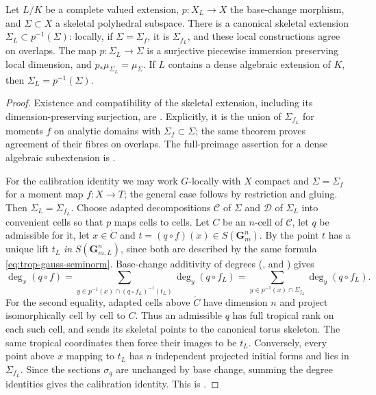 \begin{proposition}
\label{prop:trop-calibration-base-change}
Let $L/K$ be a complete valued extension, $p:X_L\to X$ the base-change
morphism, and $\Sigma\subset X$ a skeletal polyhedral subspace. There is a
canonical skeletal extension $\Sigma_L\subset p^{-1}(\Sigma)$: locally,
if $\Sigma=\Sigma_f$, it is $\Sigma_{f_L}$, and these local constructions
agree on overlaps. The map $p:\Sigma_L\to\Sigma$ is a surjective piecewise
immersion preserving local dimension, and
$p_*\mu_{\Sigma_L}=\mu_\Sigma$. If $L$ contains a dense algebraic
extension of $K$, then $\Sigma_L=p^{-1}(\Sigma)$.
\end{proposition}

\begin{proof}
Existence and compatibility of the skeletal extension, including its
dimension-preserving surjection, are
\cite[Theorem~12.9.11]{CLD25}. Explicitly, it is the union of
$\Sigma_{f_L}$ for moments $f$ on analytic domains with $\Sigma_f\subset
\Sigma$; the same theorem proves agreement of their fibres on overlaps.
The full-preimage assertion for a dense algebraic subextension is
\cite[Proposition~12.9.12(a)]{CLD25}.

For the calibration identity we may work $G$-locally with $X$ compact and
$\Sigma=\Sigma_f$ for a moment map $f:X\to T$; the general case follows by
restriction and gluing. Then $\Sigma_L=\Sigma_{f_L}$. Choose adapted
decompositions $\mathscr C$ of $\Sigma$ and $\mathscr D$ of $\Sigma_L$ into
convenient cells so that $p$ maps cells to cells. Let $C$ be an $n$-cell of
$\mathscr C$, let $q$ be admissible for it, let $x\in\mathring C$ and
$t=(q\circ f)(x)\in S(\mathbf G_m^n)$. By
 the point $t$ has a unique lift
$t_L$ \emph{in} $S(\mathbf G_{m,L}^n)$, since both are described by the same formula
\eqref{eq:trop-gauss-seminorm}. Base-change additivity of degrees
(, and \cite[Lemma~13.3.3]{CLD25}) gives
\[
 \deg_x(q\circ f)=\sum_{y\in p^{-1}(x)\cap(q\circ f_L)^{-1}(t_L)}
 \deg_y(q\circ f_L)
 =\sum_{y\in p^{-1}(x)\cap\Sigma_{f_L}}\deg_y(q\circ f_L).
\]
For the second equality, adapted cells above $\mathring C$ have dimension
$n$ and project isomorphically cell by cell to $C$. Thus an admissible $q$
has full tropical rank on each such cell, and sends its skeletal points
to the canonical torus skeleton. The same tropical coordinates then force
their images to be $t_L$. Conversely, every point above $x$ mapping to
$t_L$ has $n$ independent projected initial forms and lies in
$\Sigma_{f_L}$. Since the sections $\sigma_q$ are unchanged by base
change, summing the degree identities gives the calibration identity.
This is \cite[Proposition~14.3.6]{CLD25}.
\end{proof}

